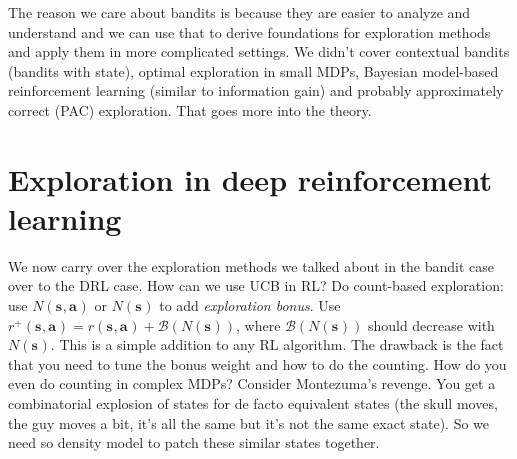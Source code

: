 \documentclass{report}
\begin{document}
The reason we care about bandits is because they are easier to analyze and understand and
we can use that to derive foundations for exploration methods and apply them in more complicated settings.
We didn't cover contextual bandits (bandits with state), optimal exploration in small MDPs,
Bayesian model-based reinforcement learning (similar to information gain) and probably approximately correct (PAC) exploration.
That goes more into the theory.

\section{Exploration in deep reinforcement learning}
We now carry over the exploration methods we talked about in the bandit case over to the DRL case.
How can we use UCB in RL?
Do count-based exploration:
use $N\left( \bm{s}_{}, \bm{a}_{} \right)$ or $N(\bm{s}_{})$ to add \textit{exploration bonus}.
Use $ r^+ (\bm{s}_{}, \bm{a}_{}) = r(\bm{s}_{}, \bm{a}_{}) + \mathcal{B} (N(\bm{s}_{}))  $,
where $\mathcal{B}(N(\bm{s}_{}))$ should decrease with $N(\bm{s}_{})$.
This is a simple addition to any RL algorithm. The drawback is the fact that you need to tune the bonus weight and how to do the counting.
How do you even do counting in complex MDPs? Consider Montezuma's revenge. 
You get a combinatorial explosion of states for de facto equivalent states (the skull moves, the guy moves a bit,
it's all the same but it's not the same exact state).
So we need so density model to patch these similar states together.
\end{document}
